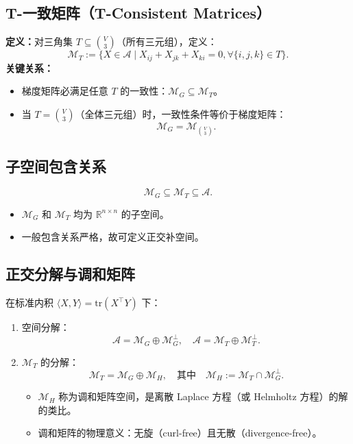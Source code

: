 \documentclass[a4paper]{article}
\begin{document}
\subsection{T-一致矩阵（T-Consistent Matrices）}
\indent \textbf{定义：}对三角集 $T \subseteq \binom{V}{3}$（所有三元组），定义：
\begin{equation}
\mathcal{M}_T := \{ X \in \mathcal{A} \mid X_{ij} + X_{jk} + X_{ki} = 0, \forall \{i,j,k\} \in T \}.
\end{equation}
\indent \textbf{关键关系：} \begin{itemize}
    \item 梯度矩阵必满足任意 $T$ 的一致性：$\mathcal{M}_G \subseteq \mathcal{M}_T$。
    \item 当 $T = \binom{V}{3}$（全体三元组）时，一致性条件等价于梯度矩阵：
    \begin{equation}
    \mathcal{M}_G = \mathcal{M}_{\binom{V}{3}}.
    \end{equation}
\end{itemize}

\subsection{子空间包含关系}
\begin{equation}
    \mathcal{M}_G \subseteq \mathcal{M}_T \subseteq \mathcal{A}.
\end{equation}
    
    \begin{itemize}
        \item $\mathcal{M}_G$ 和 $\mathcal{M}_T$ 均为 $\mathbb{R}^{n \times n}$ 的子空间。
        \item 一般包含关系严格，故可定义正交补空间。
    \end{itemize}

\subsection{正交分解与调和矩阵}
在标准内积 $\langle X, Y \rangle = \text{tr}(X^\top Y)$ 下：

\begin{enumerate}
    \item 空间分解：
    $$
    \mathcal{A} = \mathcal{M}_G \oplus \mathcal{M}_G^\perp, \quad \mathcal{A} = \mathcal{M}_T \oplus \mathcal{M}_T^\perp.
    $$
    
    \item $\mathcal{M}_T$ 的分解：
    $$
    \mathcal{M}_T = \mathcal{M}_G \oplus \mathcal{M}_H, \quad \text{其中} \quad \mathcal{M}_H := \mathcal{M}_T \cap \mathcal{M}_G^\perp.
    $$
    \begin{itemize}
        \item $\mathcal{M}_H$ 称为调和矩阵空间，是离散 Laplace 方程（或 Helmholtz 方程）的解的类比。
        \item 调和矩阵的物理意义：无旋（curl-free）且无散（divergence-free）。
    \end{itemize}
\end{enumerate}
\end{document}

